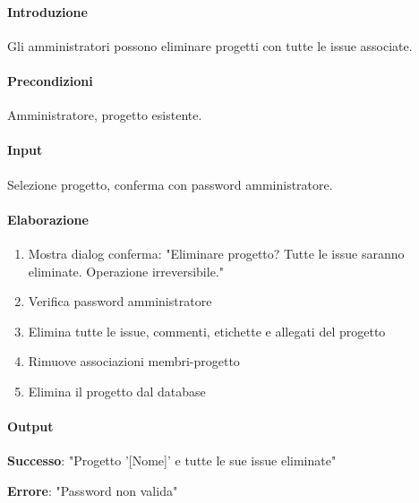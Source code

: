 
\begin{reqbox}[title=REQ-FUN-06: Elimina Progetto (solo Admin)]
\label{subsubsec:req-elimina-progetto}

\paragraph{Introduzione}
Gli amministratori possono eliminare progetti con tutte le issue associate.

\paragraph{Precondizioni}
Amministratore, progetto esistente.

\paragraph{Input}
Selezione progetto, conferma con password amministratore.

\paragraph{Elaborazione}
\begin{enumerate}[leftmargin=1.1em]
\item Mostra dialog conferma: "Eliminare progetto? Tutte le issue saranno eliminate. Operazione irreversibile."
\item Verifica password amministratore
\item Elimina tutte le issue, commenti, etichette e allegati del progetto
\item Rimuove associazioni membri-progetto
\item Elimina il progetto dal database
\end{enumerate}

\paragraph{Output}
\textbf{Successo}: "Progetto '[Nome]' e tutte le sue issue eliminate"

\textbf{Errore}: "Password non valida"

\end{reqbox}

\vspace{0.5cm}


